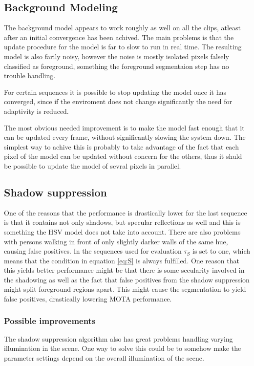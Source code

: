 
\subsection{Background Modeling}
The background model appears to work roughly as well on all the clips, atleast after an initial convergence has been achived. The main problems is that the update procedure for the model is far to slow to run in real time. The resulting model is also farily noisy, however the noise is mostly isolated pixels falsely classified as foreground, something the foreground segmentaion step has no trouble handling.

For certain sequences it is possible to stop updating the model once it has converged, since if the enviroment does not change significantly the need for adaptivity is reduced.

The most obvious needed improvement is to make the model fast enough that it can be updated every frame, without significantly slowing the system down. The simplest way to achive this is probably to take advantage of the fact that each pixel of the model can be updated without concern for the others, thus it shuld be possible to update the model of sevral pixels in parallel.

\subsection{Shadow suppression}
One of the reasons that the performance is drastically lower for the last sequence is that it contains not only shadows, but specular reflections as well and this is something the HSV model does not take into account. There are also problems with persons walking in front of only slightly darker walls of the same hue, causing false positives. In the sequences used for evaluation $\tau_S$ is set to one, which means that the condition in equation \eqref{eq:S} is always fulfilled. One reason that this yields better performance might be that there is some secularity involved in the shadowing as well as the fact that false positives from the shadow suppression might split foreground regions apart. This might cause the segmentation to yield false positives, drastically lowering MOTA performance.

\subsubsection{Possible improvements}
The shadow suppression algorithm also has great problems handling varying illumination in the scene. One way to solve this could be to somehow make the parameter settings depend on the overall illumination of the scene. 

